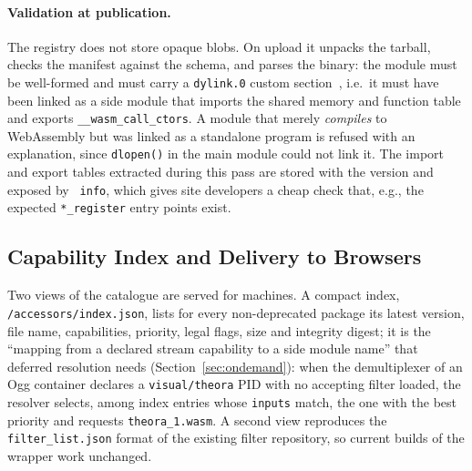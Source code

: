\paragraph{Validation at publication.}
The registry does not store opaque blobs. On upload it unpacks the tarball,
checks the manifest against the schema, and parses the binary: the module must
be well-formed and must carry a \texttt{dylink.0} custom
section~\cite{emscripten-dylink}, i.e.\ it must have been linked as a side
module that imports the shared memory and function table and exports
\texttt{\_\_wasm\_call\_ctors}. A module that merely \emph{compiles} to
WebAssembly but was linked as a standalone program is refused with an
explanation, since \texttt{dlopen()} in the main module could not link it.
The import and export tables extracted during this pass are stored with the
version and exposed by \texttt{\toolname{} info}, which gives site developers
a cheap check that, e.g., the expected \texttt{*\_register} entry points exist.

\subsection{Capability Index and Delivery to Browsers}
\label{sec:registry-index}

Two views of the catalogue are served for machines. A compact index,
\texttt{/accessors/index.json}, lists for every non-deprecated package its
latest version, file name, capabilities, priority, legal flags, size and
integrity digest; it is the ``mapping from a declared stream capability to a
side module name'' that deferred resolution needs
(Section~\ref{sec:ondemand}): when the demultiplexer of an Ogg container
declares a \texttt{visual/theora} PID with no accepting filter loaded, the
resolver selects, among index entries whose \texttt{inputs} match, the one with
the best priority and requests \texttt{theora\_1.wasm}. A second view
reproduces the \texttt{filter\_list.json} format of the existing filter
repository, so current builds of the wrapper work unchanged.

